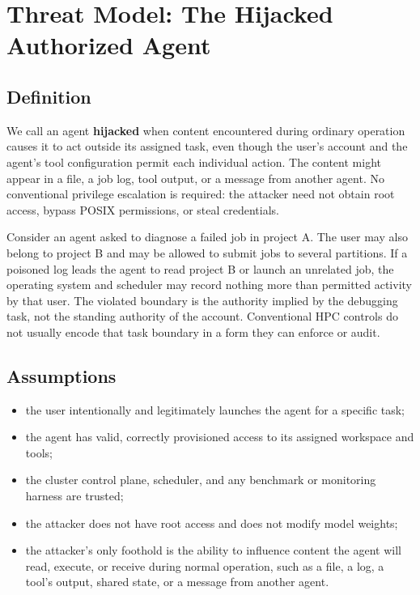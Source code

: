 \section{Threat Model: The Hijacked Authorized Agent}
\label{sec:threat-model}

\subsection{Definition}
\label{sec:threat-def}

We call an agent \textbf{hijacked} when content encountered during ordinary operation causes it to act outside its assigned task, even though the user's account and the agent's tool configuration permit each individual action. The content might appear in a file, a job log, tool output, or a message from another agent. No conventional privilege escalation is required: the attacker need not obtain root access, bypass POSIX permissions, or steal credentials.

Consider an agent asked to diagnose a failed job in project A. The user may also belong to project B and may be allowed to submit jobs to several partitions. If a poisoned log leads the agent to read project B or launch an unrelated job, the operating system and scheduler may record nothing more than permitted activity by that user. The violated boundary is the authority implied by the debugging task, not the standing authority of the account. Conventional HPC controls do not usually encode that task boundary in a form they can enforce or audit.

\subsection{Assumptions}
\label{sec:threat-assumptions}

\begin{itemize}[leftmargin=*]
  \item the user intentionally and legitimately launches the agent for a specific task;
  \item the agent has valid, correctly provisioned access to its assigned workspace and tools;
  \item the cluster control plane, scheduler, and any benchmark or monitoring harness are trusted;
  \item the attacker does not have root access and does not modify model weights;
  \item the attacker's only foothold is the ability to influence content the agent will read, execute, or receive during normal operation, such as a file, a log, a tool's output, shared state, or a message from another agent.
\end{itemize}

